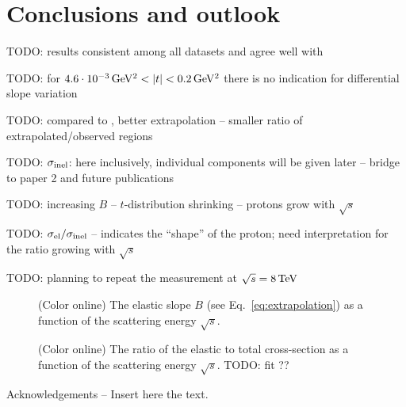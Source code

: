 \documentclass[doublecol]{../macros/epl2}
\def\un#1{\,{\rm #1}}
\begin{document}
\section{Conclusions and outlook}

TODO: results consistent among all datasets and agree well with \cite{epl96}

TODO: for $4.6\cdot10^{-3}\un{GeV^2} < |t| < 0.2\un{GeV^2}$ there is no indication for differential slope variation

TODO: compared to \cite{epl96}, better extrapolation -- smaller ratio of extrapolated/observed regions

TODO: $\sigma_{\rm inel}$: here inclusively, individual components will be given later -- bridge to paper 2 and future publications

TODO: increasing $B$ -- $t$-distribution shrinking -- protons grow with $\sqrt s$

TODO: $\sigma_{\rm el} / \sigma_{\rm inel}$ -- indicates the ``shape'' of the proton; need interpretation for the ratio growing with $\sqrt s$

TODO: planning to repeat the measurement at $\sqrt s = 8\un{TeV}$



\begin{figure}
\vskip-5mm
\caption{(Color online) The elastic slope $B$ (see Eq.~\ref{eq:extrapolation}) as a function of the scattering energy $\sqrt s$.}
\label{fig.1}
\end{figure}

\begin{figure}
\vskip-5mm
\caption{(Color online) The ratio of the elastic to total cross-section as a function of the scattering energy $\sqrt s$. TODO: fit ??}
\label{fig.1}
\end{figure}




\acknowledgments
Acknowledgements -- Insert here the text.
\end{document}
